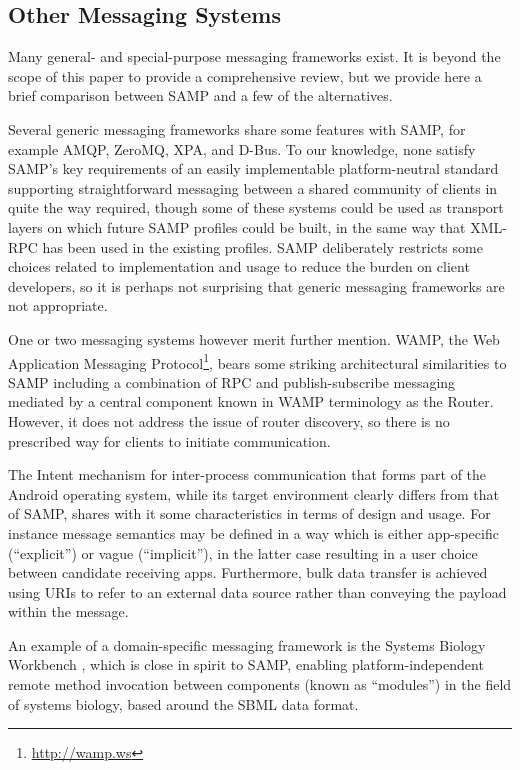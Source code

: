 \documentclass[5p]{elsarticle}
\begin{document}
\subsection{Other Messaging Systems}

Many general- and special-purpose messaging frameworks exist.
It is beyond the scope of this paper to provide a comprehensive
review, but we provide here a brief comparison between SAMP and
a few of the alternatives.

Several generic messaging frameworks share some features with SAMP, 
for example AMQP, ZeroMQ, XPA, and D-Bus.
To our knowledge, none
satisfy SAMP's key requirements of an easily implementable
platform-neutral standard supporting straightforward messaging
between a shared community of clients in quite the way required,
though some of these systems could be used as transport layers on
which future SAMP profiles could be built, in the same way
that XML-RPC has been used in the existing profiles.
SAMP deliberately restricts some choices related to implementation
and usage to reduce the burden on client developers,
so it is perhaps not surprising that generic messaging
frameworks are not appropriate.

One or two messaging systems however merit further mention.
WAMP, the Web Application Messaging Protocol\footnote{\url{http://wamp.ws}}, 
bears some striking architectural similarities to SAMP including 
a combination of RPC and publish-subscribe messaging mediated by 
a central component known in WAMP terminology as the Router.
However, it does not address the issue of router discovery,
so there is no prescribed way for clients to initiate communication.

The Intent mechanism for inter-process communication that forms part of
the Android operating system, while its target environment
clearly differs from that of SAMP,
shares with it some characteristics in terms of design and usage.
For instance message semantics may be defined in a way which
is either app-specific (``explicit'') or vague (``implicit''),
in the latter case resulting in a
user choice between candidate receiving apps.
Furthermore, bulk data transfer is achieved
using URIs to refer to an external data source
rather than conveying the payload within the message.

An example of a domain-specific messaging framework is
the Systems Biology Workbench \citep{sbw},
which is close in spirit to SAMP, enabling platform-independent 
remote method invocation between components (known as ``modules'') 
in the field of systems biology, based around the SBML data format.
\end{document}
